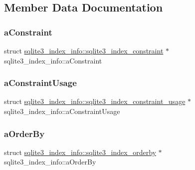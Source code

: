 \subsection{Member Data Documentation}
\mbox{\label{structsqlite3__index__info_a634aa93834e2b47acf34454746c0f248}} 
\subsubsection{\texorpdfstring{aConstraint}{aConstraint}}
{\footnotesize\ttfamily struct \mbox{\hyperlink{structsqlite3__index__info_1_1sqlite3__index__constraint}{sqlite3\+\_\+index\+\_\+info\+::sqlite3\+\_\+index\+\_\+constraint}} $\ast$ sqlite3\+\_\+index\+\_\+info\+::a\+Constraint}

\mbox{\label{structsqlite3__index__info_a79b8a969dd7d582fc2ea3c0fbc5adb56}} 
\subsubsection{\texorpdfstring{aConstraintUsage}{aConstraintUsage}}
{\footnotesize\ttfamily struct \mbox{\hyperlink{structsqlite3__index__info_1_1sqlite3__index__constraint__usage}{sqlite3\+\_\+index\+\_\+info\+::sqlite3\+\_\+index\+\_\+constraint\+\_\+usage}} $\ast$ sqlite3\+\_\+index\+\_\+info\+::a\+Constraint\+Usage}

\mbox{\label{structsqlite3__index__info_a6823a68979e19d8e332389361e920ef9}} 
\subsubsection{\texorpdfstring{aOrderBy}{aOrderBy}}
{\footnotesize\ttfamily struct \mbox{\hyperlink{structsqlite3__index__info_1_1sqlite3__index__orderby}{sqlite3\+\_\+index\+\_\+info\+::sqlite3\+\_\+index\+\_\+orderby}} $\ast$ sqlite3\+\_\+index\+\_\+info\+::a\+Order\+By}

